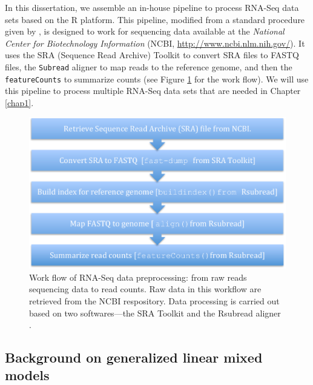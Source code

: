 In this dissertation, we assemble an in-house pipeline to process RNA-Seq data sets based on the R 
\citep{Rpackage} platform. This pipeline, modified from a standard procedure given by 
\citet{anders2013count}, is designed to work for sequencing data available at the \textit{National 
Center for Biotechnology Information} (NCBI, \url{http://www.ncbi.nlm.nih.gov/}). It uses the SRA 
(Sequence Read Archive) Toolkit \citep{leinonen2010sequence} to convert SRA files to FASTQ files, 
the \verb|Subread| aligner \citep{liao2013subread} to map reads to the reference genome, and then 
the \verb|featureCounts| \citep{liao2013featurecounts} to summarize counts (see Figure 
\ref{fig:flowchart} for the work flow). We will use this pipeline to process multiple RNA-Seq data 
sets that are needed in Chapter \ref{chap1}.
\begin{figure}[!ht]
	\centering
	\includegraphics[width=0.7\linewidth]{Figures/flowchart.pdf}
	\caption[Work flow of RNA-Seq data preprocessing]{Work flow of RNA-Seq data preprocessing: from 
	raw reads sequencing data to read counts. Raw 
	data in this workflow are retrieved from the NCBI respository. Data processing is carried out 
	based on two softwares---the SRA Toolkit \citep{leinonen2010sequence} and the Rsubread aligner 
	\citep{liao2013subread}.}
	\label{fig:flowchart}
\end{figure}	



\subsection{Background on generalized linear mixed models}\label{subsec:glmm}

